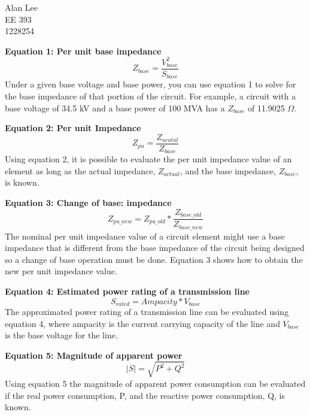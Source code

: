 \documentclass[]{article}
\begin{document}
\noindent Alan Lee \\
EE 393	\\
1228254 

\vspace{5mm}
\noindent \large \textbf{Equation 1: Per unit base impedance}\\
\begin{equation}
Z_{base} = \frac{V_{base}^2}{S_{base}}
\end{equation}
Under a given base voltage and base power, you can use equation 1 to solve for the base impedance of that portion of the circuit. For example, a circuit with a base voltage of 34.5 kV and a base power of 100 MVA has a $Z_{base}$ of 11.9025 $\Omega$.\\
\vspace{5mm}

\noindent \large \textbf{Equation 2: Per unit Impedance}\\
\begin{equation}
Z_{pu} = \frac{Z_{acutal}} {Z_{base}}
\end{equation}
Using equation 2, it is possible to evaluate the per unit impedance value of an element as long as the actual impedance, $Z_{actual}$, and the base impedance, $Z_{base}$, is known.\\
\vspace{5mm}

\noindent \large \textbf{Equation 3: Change of base: impedance}\\
\begin{equation}
Z_{pu\_new} = Z_{pu\_old}* \frac{Z_{base\_old}}{Z_{base\_new}}
\end{equation}
The nominal per unit impedance value of a circuit element might use a base impedance that is different from the base impedance of the circuit being designed so a change of base operation must be done. Equation 3 shows how to obtain the new per unit impedance value.
\vspace{5mm}

\noindent \large \textbf{Equation 4: Estimated power rating of a transmission line}\\
\begin{equation}
S_{rated} = Ampacity * V_{base}
\end{equation}
The approximated power rating of a transmission line can be evaluated using equation 4, where ampacity is the current carrying capacity of the line and $V_{base}$ is the base voltage for the line.  
 \newpage

\noindent \large \textbf{Equation 5: Magnitude of apparent power}\\
\begin{equation}
|S| = \sqrt{P^2+Q^2}
\end{equation}
Using equation 5 the magnitude of apparent power consumption can be evaluated if the real power consumption, P, and the reactive power consumption, Q, is known. 
\end{document}
